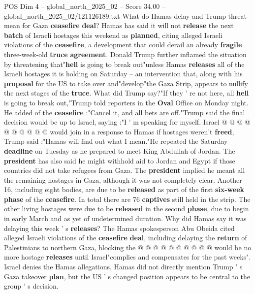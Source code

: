 \begin{textsample}{POS Dim 4 – global\_north\_2025\_02 – Score 34.00 – global\_north\_2025\_02/121126189.txt}  \label{ex:f4_pos_054}
What do Hamas delay and Trump threat mean for Gaza \textbf{ceasefire} \textbf{deal}?
Hamas has said it will not \textbf{release} the next \textbf{batch} of Israeli hostages this weekend as \textbf{planned}, citing alleged Israeli violations of the \textbf{ceasefire}, a development that could derail an already \textbf{fragile} three-week-old \textbf{truce} \textbf{agreement}.
Donald Trump further inflamed the situation by threatening that"\textbf{hell} is going to break out"unless Hamas \textbf{releases} all of the Israeli hostages it is holding on Saturday -- an intervention that, along with his \textbf{proposal} for the US to take over and"develop"the Gaza Strip, appears to nullify the next stages of the \textbf{truce}.
What did Trump say?"If they ' re not here, all \textbf{hell} is going to break out,"Trump told reporters in the \textbf{Oval} Office on Monday night.
He added of the \textbf{ceasefire} :"Cancel it, and all bets are off."Trump said the final decision would be up to Israel, saying :"I ' m speaking for myself.
Israel @ @ @ @ @ @ @ @ @ @ would join in a response to Hamas if hostages weren't \textbf{freed}, Trump said :"Hamas will find out what I mean."He repeated the Saturday \textbf{deadline} on Tuesday as he prepared to meet King Abdullah of Jordan.
The \textbf{president} has also said he might withhold aid to Jordan and Egypt if those countries did not take refugees from Gaza.
The \textbf{president} implied he meant all the remaining hostages in Gaza, although it was not completely clear.
Another 16, including eight bodies, are due to be \textbf{released} as part of the first \textbf{six-week} \textbf{phase} of the \textbf{ceasefire}.
In total there are 76 \textbf{captives} still held in the strip.
The other living hostages were due to be \textbf{released} in the second \textbf{phase}, due to begin in early March and as yet of undetermined duration.
Why did Hamas say it was delaying this week ' s \textbf{releases}?
The Hamas spokesperson Abu Obeida cited alleged Israeli violations of the \textbf{ceasefire} \textbf{deal}, including delaying the \textbf{return} of Palestinians to northern Gaza, blocking the @ @ @ @ @ @ @ @ @ @ would be no more hostage \textbf{releases} until Israel"complies and compensates for the past weeks".
Israel denies the Hamas allegations.
Hamas did not directly mention Trump ' s Gaza takeover \textbf{plan}, but the US ' s changed position appears to be central to the group ' s decision.

\end{textsample}
